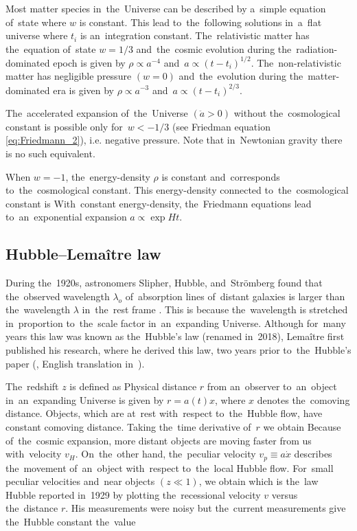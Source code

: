 Most matter species in~the~Universe can be described by a~simple equation of~state
where $w$ is constant. This lead to~the~following solutions in~a~flat universe
where $t_i$ is an~integration constant. The~relativistic matter has the~equation of~state $w=1/3$ and~the~cosmic evolution during the~radiation-dominated epoch is given by $\rho\propto a^{-4}$ and~$a\propto(t-t_i)^{1/2}$. The~non-relativistic matter has negligible pressure $(w=0)$ and~the~evolution during the~matter-dominated era is given by $\rho\propto a^{-3}$ and~$a\propto(t-t_i)^{2/3}$.

The~accelerated expansion of~the~Universe $(\ddot a>0)$ without the~cosmological constant is possible only for~$w<-1/3$ (see Friedman equation \eqref{eq:Friedmann_2}), i.e. negative pressure. Note that in~Newtonian gravity there is no such equivalent.

When $w=-1$, the~energy-density $\rho$ is constant and~corresponds to~the~cosmological constant. This energy-density connected to~the~cosmological constant is
With~constant energy-density, the~Friedmann equations lead to~an~exponential expansion $a\propto\exp{Ht}$.
 
\subsection{Hubble--Lema\^{i}tre law}
During the~1920s, astronomers Slipher, Hubble, and~Str{\"o}mberg found that the~observed wavelength $\lambda_o$ of~absorption lines of~distant galaxies is larger than the~wavelength $\lambda$ in~the~rest frame \parencite{1925ApJ....61..353S,1929PNAS...15..168H}. This is because the~wavelength is stretched in~proportion to~the~scale factor in~an~expanding Universe. Although for~many years this law was known as the~Hubble's law (renamed in~2018), Lema\^{i}tre first published his research, where he derived this law, two years prior to~the~Hubble's paper (\textcite{1927ASSB...47...49L}, English translation in~\textcite{1931MNRAS..91..483L}).

The~redshift $z$ is defined as
Physical distance $r$ from an~observer to~an~object in~an~expanding Universe is given by $r=a(t)x$, where $x$ denotes the~comoving distance. Objects, which are at~rest with~respect to~the~Hubble flow, have constant comoving distance. Taking the~time derivative of~$r$ we obtain
Because of~the~cosmic expansion, more distant objects are moving faster from us with~velocity $v_H$. On~the~other hand, the~peculiar velocity $v_p\equiv a\dot x$ describes the~movement of~an~object with~respect to~the~local Hubble flow. For~small peculiar velocities and~near objects $(z\ll1)$, we obtain
which is the~law Hubble reported in~1929 by plotting the~recessional velocity $v$ versus the~distance $r$. His measurements were noisy but the~current measurements give the~Hubble constant the~value \parencite{planck_cosm}
